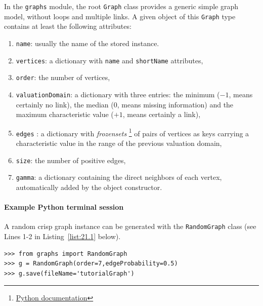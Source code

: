 In the \Digraph \texttt{graphs} module, the root \texttt{Graph} class  provides a generic simple graph model, without loops and multiple links. A given object of this \texttt{Graph} type contains at least the following attributes:
\begin{enumerate}[topsep=1pt]
\item \texttt{name}: usually the name of the stored instance.
\item \texttt{vertices}: a dictionary with \texttt{name} and \texttt{shortName} attributes,
\item \texttt{order}: the number of vertices,
\item \texttt{valuationDomain}: a dictionary with three entries: the minimum ($-1$, means certainly no link), the median ($0$, means missing information) and the maximum characteristic value ($+1$, means certainly a link),
\item \texttt{edges} : a dictionary with \emph{frozensets} \footnote{\href{https://docs.python.org/3.9/library/stdtypes.html?highlight=frozenset\#frozenset}{Python documentation}} of pairs of vertices as keys carrying a characteristic value in the range of the previous valuation domain,
\item \texttt{size}: the number of positive edges,
\item \texttt{gamma}: a dictionary containing the direct neighbors of each vertex, automatically added by the object constructor.
\end{enumerate}

\paragraph{\textbf{Example Python terminal session}}

\noindent A random crisp graph instance can be generated with the \texttt{RandomGraph} class (see Lines 1-2 in Listing~\vref{list:21.1} below). 
\begin{lstlisting}[caption={Generating a randm graph instance},label=list:21.1]
>>> from graphs import RandomGraph
>>> g = RandomGraph(order=7,edgeProbability=0.5)
>>> g.save(fileName='tutorialGraph')
\end{lstlisting}

